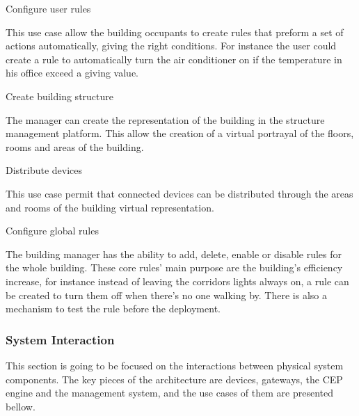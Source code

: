 \begin{Paragraph}{Configure user rules}
	
This use case allow the building occupants to create rules that preform a set of actions automatically, giving the right conditions. For instance the user could create a rule to automatically turn the air conditioner on if the temperature in his office exceed a giving value.
	
\end{Paragraph}


\begin{Paragraph}{Create building structure}
	
The manager can create the representation of the building in the structure management platform. This allow the creation of a virtual portrayal of the floors, rooms and areas of the building.
	
\end{Paragraph}

\begin{Paragraph}{Distribute devices}

This use case permit that connected devices can be distributed through the areas and rooms of the building virtual representation.
	
\end{Paragraph}

\begin{Paragraph}{Configure global rules}

The building manager has the ability to add, delete, enable or disable rules for the whole building. These core rules' main purpose are the building's efficiency increase, for instance instead of leaving the corridors lights always on, a rule can be created to turn them off when there's no one walking by. There is also a mechanism to test the rule before the deployment.

\end{Paragraph}


\subsubsection{System Interaction}
\label{Use:system}

This section is going to be focused on the interactions between physical system components. The key pieces of the architecture are  devices, gateways, the CEP engine and the management system, and the use cases of them are presented bellow.

